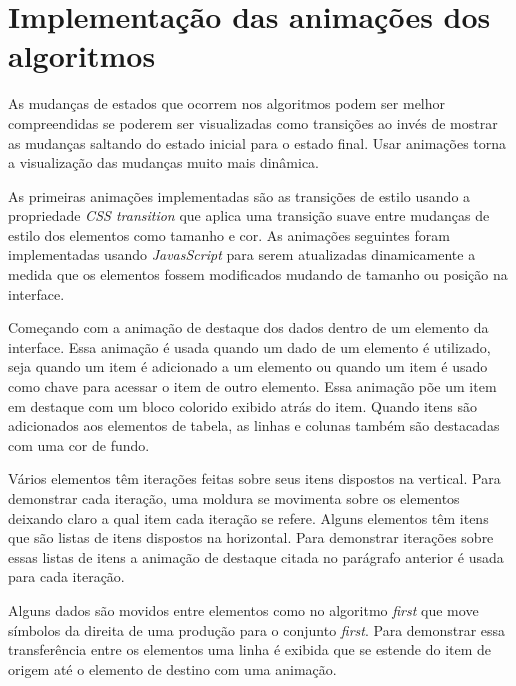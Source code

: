 \section{Implementação das animações dos algoritmos}
As mudanças de estados que ocorrem nos algoritmos podem ser melhor compreendidas se poderem ser visualizadas como transições ao invés de mostrar as mudanças saltando do estado inicial para o estado final. Usar animações torna a visualização das mudanças muito mais dinâmica.

As primeiras animações implementadas são as transições de estilo usando a propriedade \textit{CSS transition} que aplica uma transição suave entre mudanças de estilo dos elementos como tamanho e cor. As animações seguintes foram implementadas usando \textit{JavasScript} para serem atualizadas dinamicamente a medida que os elementos fossem modificados mudando de tamanho ou posição na interface.

Começando com a animação de destaque dos dados dentro de um elemento da interface. Essa animação é usada quando um dado de um elemento é utilizado, seja quando um item é adicionado a um elemento ou quando um item é usado como chave para acessar o item de outro elemento. Essa animação põe um item em destaque com um bloco colorido exibido atrás do item. Quando itens são adicionados aos elementos de tabela, as linhas e colunas também são destacadas com uma cor de fundo.

Vários elementos têm iterações feitas sobre seus itens dispostos na vertical. Para demonstrar cada iteração, uma moldura se movimenta sobre os elementos deixando claro a qual item cada iteração se refere. Alguns elementos têm itens que são listas de itens dispostos na horizontal. Para demonstrar iterações sobre essas listas de itens a animação de destaque citada no parágrafo anterior é usada para cada iteração.

Alguns dados são movidos entre elementos como no algoritmo \textit{first} que move símbolos da direita de uma produção para o conjunto \textit{first}. Para demonstrar essa transferência entre os elementos uma linha é exibida que se estende do item de origem até o elemento de destino com uma animação.



